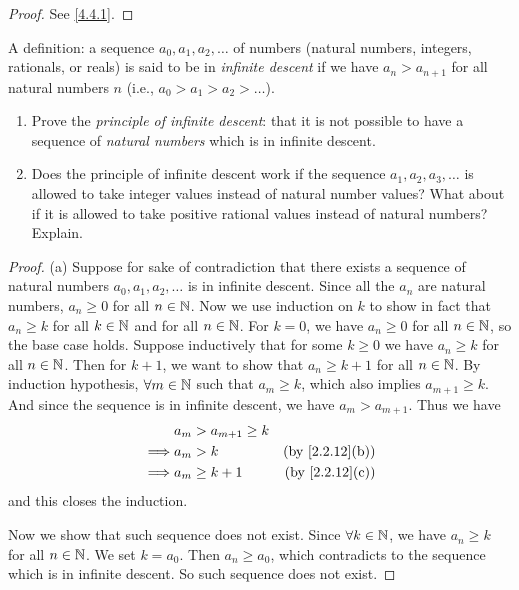 \begin{proof}
  See \cref{4.4.1}.
\end{proof}

\begin{ex}\label{ex:4.4.2}
A definition: a sequence \(a_0, a_1, a_2, \dots\) of numbers (natural numbers, integers, rationals, or reals) is said to be in \emph{infinite descent} if we have \(a_n > a_{n + 1}\) for all natural numbers \(n\)
(i.e., \(a_0 > a_1 > a_2 > \dots\)).
\begin{enumerate}
  \item Prove the \emph{principle of infinite descent}:
        that it is not possible to have a sequence of \emph{natural numbers} which is in infinite descent.
  \item Does the principle of infinite descent work if the sequence \(a_1, a_2, a_3, \dots\) is allowed to take integer values instead of natural number values?
        What about if it is allowed to take positive rational values instead of natural numbers?
        Explain.
\end{enumerate}
\end{ex}

\begin{proof}{(a)}
  Suppose for sake of contradiction that there exists a sequence of natural numbers \(a_0, a_1, a_2, \dots\) is in infinite descent.
  Since all the \(a_n\) are natural numbers, \(a_n \geq 0\) for all \(n \in \mathbb{N}\).
  Now we use induction on \(k\) to show in fact that \(a_n \geq k\) for all \(k \in \mathbb{N}\) and for all \(n \in \mathbb{N}\).
  For \(k = 0\), we have \(a_n \geq 0\) for all \(n \in \mathbb{N}\), so the base case holds.
  Suppose inductively that for some \(k \geq 0\) we have \(a_n \geq k\) for all \(n \in \mathbb{N}\).
  Then for \(k + 1\), we want to show that \(a_n \geq k + 1\) for all \(n \in \mathbb{N}\).
  By induction hypothesis, \(\forall m \in \mathbb{N}\) such that \(a_m \geq k\), which also implies \(a_{m + 1} \geq k\).
  And since the sequence is in infinite descent, we have \(a_m > a_{m + 1}\).
  Thus we have
  \begin{align*}
             & a_m > a_{m + 1} \geq k                                \\
    \implies & a_m > k                & \text{(by \cref{2.2.12}(b))} \\
    \implies & a_m \geq k + 1         & \text{(by \cref{2.2.12}(c))}
  \end{align*}
  and this closes the induction.

  Now we show that such sequence does not exist.
  Since \(\forall k \in \mathbb{N}\), we have \(a_n \geq k\) for all \(n \in \mathbb{N}\).
  We set \(k = a_0\).
  Then \(a_n \geq a_0\), which contradicts to the sequence which is in infinite descent.
  So such sequence does not exist.
\end{proof}

